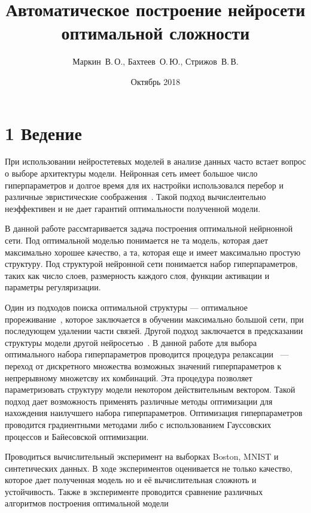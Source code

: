 \documentclass[12pt,twoside]{article}
\title{Автоматическое построение нейросети оптимальной сложности}
\author{Маркин~В.\,О., Бахтеев~О.\,Ю., Стрижов~В.\,В.}
\date{Октябрь 2018}
\begin{document}
\maketitle
\section{1 Ведение}
При использовании нейростетевых моделей в анализе данных часто встает вопрос о выборе архитектуры модели. Нейронная сеть имеет большое число гиперпараметров и долгое время для их настройки использовался перебор и различные эвристические соображения~\cite{DBLP:conf/emnlp/Kim14}. Такой подход вычислеительно неэффективен и не дает гарантий оптимальности полученной модели.


В данной работе рассмтаривается задача построения оптимальной нейрнонной сети.
Под оптимальной моделью понимается не та модель, которая дает максимально хорошее качество, а та, которая еще и имеет максимально простую структуру. Под структурой нейронной сети понимается набор гиперпараметров, таких как число слоев, размерность каждого слоя, функции активации и параметры регуляризации.
 
 Один из подходов поиска оптимальной структуры --- оптимальное прореживание~\cite{Cun:1990:OBD:109230.109298}, которое заключается в обучении максимально большой сети, при последующем удалении части связей. Другой подход заключается в предсказании структуры модели другой нейросетью~\cite{Sutskever:2014:SSL:2969033.2969173}.
 В данной работе для выбора оптимального набора гиперпараметров проводится процедура релаксации~\cite{Liu2018DARTSDA} --- переход от дискретного множества возможных значений гиперпараметров к непрерывному множетсву их комбинаций. Эта процедура позволяет параметризовать структуру модели некотором действительным вектором.
Такой подход дает возможность применять различные методы оптимизации для нахождения наилучшего набора гиперпараметров.
 Оптимизация гиперпараметров проводится градиентными методами \cite{pmlr-v37-maclaurin15, pmlr-v70-franceschi17a, Pedregosa} либо с использованием Гауссовских процессов и Байесовской оптимизации.



Проводиться вычислительный эксперимент на выборках Boston, MNIST\cite{lecun-mnisthandwrittendigit-2010} и синтетических данных. В ходе экспериментов оценивается не только качество, которое дает полученная модель но и её вычислительная сложноть и устойчивость. Также в эксперименте проводится сравнение различных алгоритмов построения оптимальной модели 



\end{document}
